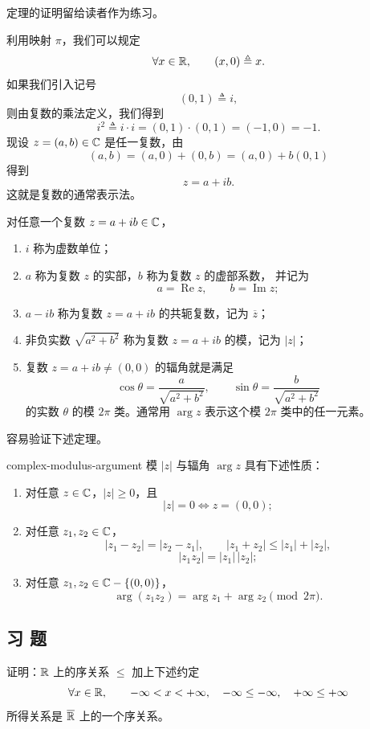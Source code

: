 定理的证明留给读者作为练习。

利用映射 \(\pi\)，我们可以规定
\[
\forall x\in\mathbb{R},\qquad (x,0)\mathrel{\triangleq}x.
\]
如果我们引入记号
\[
(0,1)\mathrel{\triangleq}i,
\]
则由复数的乘法定义，我们得到
\[
i^2\mathrel{\triangleq}i\cdot i=(0,1)\cdot(0,1)=(-1,0)=-1.
\]
现设 \(z=(a,b)\in\mathbb{C}\) 是任一复数，由
\[
(a,b)=(a,0)+(0,b)=(a,0)+b(0,1)
\]
得到
\[
z=a+ib.
\]
这就是复数的通常表示法。

\begin{mydef*}{}
对任意一个复数 \(z=a+ib\in\mathbb{C}\)，
\begin{enumerate}[label=\arabic*)]
  \item \(i\) 称为虚数单位；
  \item \(a\) 称为复数 \(z\) 的实部，\(b\) 称为复数 \(z\) 的虚部系数，
  并记为
  \[
  a=\operatorname{Re}z,\qquad b=\operatorname{Im}z;
  \]
  \item \(a-ib\) 称为复数 \(z=a+ib\) 的共轭复数，记为 \(\overline z\)；
  \item 非负实数 \(\sqrt{a^2+b^2}\) 称为复数 \(z=a+ib\) 的模，记为 \(|z|\)；
  \item 复数 \(z=a+ib\neq(0,0)\) 的辐角就是满足
  \[
  \cos\theta=\frac{a}{\sqrt{a^2+b^2}},
  \qquad
  \sin\theta=\frac{b}{\sqrt{a^2+b^2}}
  \]
  的实数 \(\theta\) 的模 \(2\pi\) 类。通常用 \(\arg z\) 表示这个模
  \(2\pi\) 类中的任一元素。
\end{enumerate}
\end{mydef*}

容易验证下述定理。

\begin{mythm}{}{complex-modulus-argument}
模 \(|z|\) 与辐角 \(\arg z\) 具有下述性质：
\begin{enumerate}[label=\arabic*)]
  \item 对任意 \(z\in\mathbb{C}\)，\(|z|\geq0\)，且
  \[
  |z|=0\iff z=(0,0);
  \]
  \item 对任意 \(z_1,z_2\in\mathbb{C}\)，
  \[
  |z_1-z_2|=|z_2-z_1|,\qquad
  |z_1+z_2|\leq|z_1|+|z_2|,
  \]
  \[
  |z_1z_2|=|z_1|\,|z_2|;
  \]
  \item 对任意 \(z_1,z_2\in\mathbb{C}-\{(0,0)\}\)，
  \[
  \arg(z_1z_2)=\arg z_1+\arg z_2\pmod{2\pi}.
  \]
\end{enumerate}
\end{mythm}

\subsection{习 题}

\begin{exercise}
  \item 证明：\(\mathbb{R}\) 上的序关系 \(\leq\) 加上下述约定
  \[
  \forall x\in\mathbb{R},\qquad
  -\infty<x<+\infty,\quad
  -\infty\leq-\infty,\quad
  +\infty\leq+\infty
  \]
  所得关系是 \(\overline{\mathbb{R}}\) 上的一个序关系。
\end{exercise}

